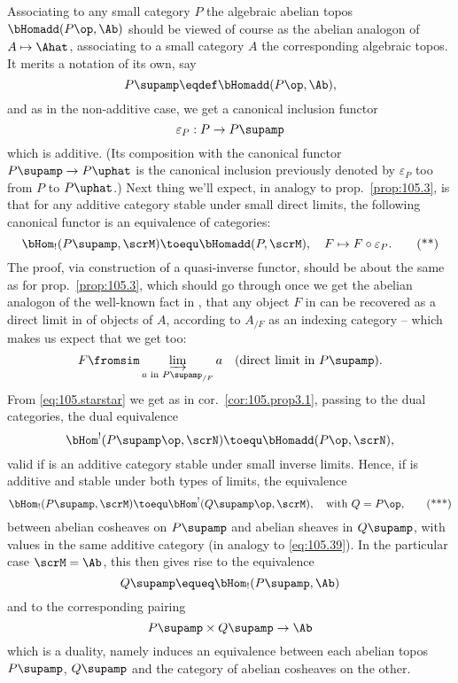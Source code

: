 Associating to any small category $P$ the
algebraic abelian topos $\bHomadd(P\op,\Ab)$ should be viewed of
course as the abelian analogon of $A\mapsto\Ahat$, associating to a
small category $A$ the corresponding algebraic topos. It merits a
notation of its own, say
\[P\supamp\eqdef \bHomadd(P\op,\Ab),\]
and as in the non-additive case, we get a canonical inclusion functor
\[\varepsilon_P:P\to P\supamp\]
which is additive. (Its composition with the canonical functor
$P\supamp\to P\uphat$ is the canonical inclusion
previously denoted by $\varepsilon_P$ too from $P$ to $P\uphat$.) Next
thing we'll expect, in analogy to prop.\ \ref{prop:105.3}, is that for
any additive category \scrM{} stable under small direct limits, the
following canonical functor is an equivalence of categories:
\begin{equation}
  \label{eq:105.starstar}
  \bHom_!(P\supamp,\scrM) \toequ \bHomadd(P,\scrM), \quad
  F\mapsto F\circ\varepsilon_P.\tag{**}
\end{equation}
The proof, via construction of a quasi-inverse functor, should be
about the same as for prop.\ \ref{prop:105.3}, which should go through
once we get the abelian analogon of the well-known fact in \Ahat, that
any object $F$ in \Ahat{} can be recovered as a direct limit in
\Ahat{} of objects of $A$, according to $A_{/F}$ as an indexing
category -- which makes us expect that we get too:
\[F \fromsim \varinjlim_{\text{$a$ in $P\supamp_{/F}$}} a\quad
(\text{direct limit in $P\supamp$}).\]
From \eqref{eq:105.starstar} we get as in cor.\ \ref{cor:105.prop3.1},
passing to the dual categories, the dual equivalence
\[\bHom^!({P\supamp}\op,\scrN) \toequ \bHomadd(P\op,\scrN),\]
valid if \scrN{} is an additive category stable under small inverse
limits. Hence, if \scrM{} is additive and stable under both types of
limits, the equivalence
\begin{equation}
  \label{eq:105.starstarstar}
  \bHom_!(P\supamp,\scrM)\toequ \bHom^!({Q\supamp}\op,\scrM), \quad
  \text{with $Q=P\op$,}\tag{***}
\end{equation}
between abelian cosheaves on $P\supamp$ and abelian sheaves in
$Q\supamp$, with values in the same additive category (in analogy to
\eqref{eq:105.39}). In the particular case $\scrM=\Ab$, this then
gives rise to the equivalence
\[Q\supamp \equeq \bHom_!(P\supamp,\Ab)\]
and to the corresponding pairing
\[P\supamp\times Q\supamp\to\Ab\]
which is a duality, namely induces an equivalence between each abelian
topos $P\supamp$, $Q\supamp$ and the category of abelian
cosheaves on the other.

